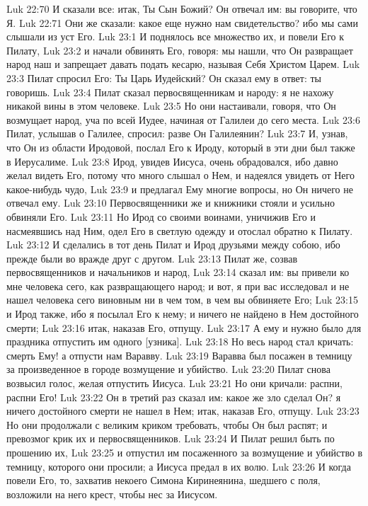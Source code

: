 Luk 22:70  И сказали все: итак, Ты Сын Божий? Он отвечал им: вы говорите, что Я.
Luk 22:71  Они же сказали: какое еще нужно нам свидетельство? ибо мы сами слышали из уст Его.
Luk 23:1  И поднялось все множество их, и повели Его к Пилату,
Luk 23:2  и начали обвинять Его, говоря: мы нашли, что Он развращает народ наш и запрещает давать подать кесарю, называя Себя Христом Царем.
Luk 23:3  Пилат спросил Его: Ты Царь Иудейский? Он сказал ему в ответ: ты говоришь.
Luk 23:4  Пилат сказал первосвященникам и народу: я не нахожу никакой вины в этом человеке.
Luk 23:5  Но они настаивали, говоря, что Он возмущает народ, уча по всей Иудее, начиная от Галилеи до сего места.
Luk 23:6  Пилат, услышав о Галилее, спросил: разве Он Галилеянин?
Luk 23:7  И, узнав, что Он из области Иродовой, послал Его к Ироду, который в эти дни был также в Иерусалиме.
Luk 23:8  Ирод, увидев Иисуса, очень обрадовался, ибо давно желал видеть Его, потому что много слышал о Нем, и надеялся увидеть от Него какое-нибудь чудо,
Luk 23:9  и предлагал Ему многие вопросы, но Он ничего не отвечал ему.
Luk 23:10  Первосвященники же и книжники стояли и усильно обвиняли Его.
Luk 23:11  Но Ирод со своими воинами, уничижив Его и насмеявшись над Ним, одел Его в светлую одежду и отослал обратно к Пилату.
Luk 23:12  И сделались в тот день Пилат и Ирод друзьями между собою, ибо прежде были во вражде друг с другом.
Luk 23:13  Пилат же, созвав первосвященников и начальников и народ,
Luk 23:14  сказал им: вы привели ко мне человека сего, как развращающего народ; и вот, я при вас исследовал и не нашел человека сего виновным ни в чем том, в чем вы обвиняете Его;
Luk 23:15  и Ирод также, ибо я посылал Его к нему; и ничего не найдено в Нем достойного смерти;
Luk 23:16  итак, наказав Его, отпущу.
Luk 23:17  А ему и нужно было для праздника отпустить им одного [узника].
Luk 23:18  Но весь народ стал кричать: смерть Ему! а отпусти нам Варавву.
Luk 23:19  Варавва был посажен в темницу за произведенное в городе возмущение и убийство.
Luk 23:20  Пилат снова возвысил голос, желая отпустить Иисуса.
Luk 23:21  Но они кричали: распни, распни Его!
Luk 23:22  Он в третий раз сказал им: какое же зло сделал Он? я ничего достойного смерти не нашел в Нем; итак, наказав Его, отпущу.
Luk 23:23  Но они продолжали с великим криком требовать, чтобы Он был распят; и превозмог крик их и первосвященников.
Luk 23:24  И Пилат решил быть по прошению их,
Luk 23:25  и отпустил им посаженного за возмущение и убийство в темницу, которого они просили; а Иисуса предал в их волю.
Luk 23:26  И когда повели Его, то, захватив некоего Симона Киринеянина, шедшего с поля, возложили на него крест, чтобы нес за Иисусом.
